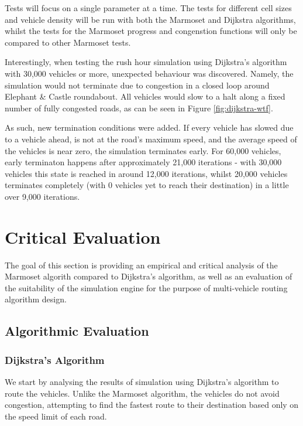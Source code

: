 \documentclass[ %
                    author={Alexander Hill},
                supervisor={Dr. Benjamin Sach},
                    degree={MEng},
                     title={MARMOSET},
                  subtitle={Multi-Agent Route Management using Online Simulation for Efficient Transportation},
                      type={research},
                      year={2016} ]{dissertation}
\begin{document}
Tests will focus on a single parameter at a time. The tests for different cell
sizes and vehicle density will be run with both the Marmoset and Dijkstra
algorithms, whilst the tests for the Marmoset progress and congenstion functions
will only be compared to other Marmoset tests.

Interestingly, when testing the rush hour simulation using Dijkstra's algorithm
with 30,000 vehicles or more, unexpected behaviour was discovered. Namely, the
simulation would not terminate due to congestion in a closed loop around
Elephant \& Castle roundabout. All vehicles would slow to a halt along a fixed
number of fully congested roads, as can be seen in Figure \ref{fig:dijkstra-wtf}.

As such, new termination conditions were added. If every vehicle has slowed due
to a vehicle ahead, is not at the road's maximum speed, and the average speed of
the vehicles is near zero, the simulation terminates early. For 60,000 vehicles,
early terminaton happens after approximately 21,000 iterations - with 30,000
vehicles this state is reached in around 12,000 iterations, whilst 20,000
vehicles terminates completely (with 0 vehicles yet to reach their destination)
in a little over 9,000 iterations.


\chapter{Critical Evaluation}
\label{chap:evaluation}

The goal of this section is providing an empirical and critical analysis of the
Marmoset algorith compared to Dijkstra's algorithm, as well as an evaluation of
the suitability of the simulation engine for the purpose of multi-vehicle
routing algorithm design.

\section{Algorithmic Evaluation}

\subsection{Dijkstra's Algorithm}\label{sec:density}

We start by analysing the results of simulation using Dijkstra's algorithm to
route the vehicles. Unlike the Marmoset algorithm, the vehicles do not avoid
congestion, attempting to find the fastest route to their destination based only
on the speed limit of each road.
\end{document}
